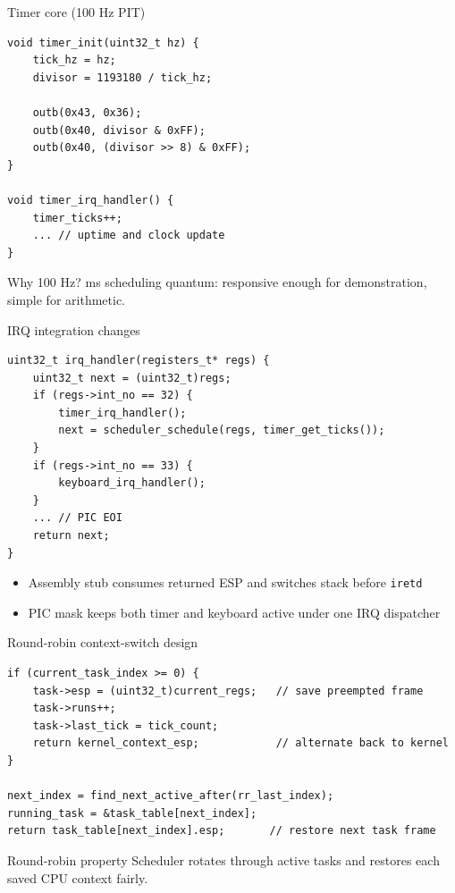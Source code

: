 \documentclass[aspectratio=169]{beamer}
\newcommand{\concept}[2]{%
  \begin{block}{#1}\smallskip #2\smallskip\end{block}\vspace{5pt}}
\begin{document}
\begin{frame}[fragile]{Timer core (100 Hz PIT)}
\begin{lstlisting}[style=clang]
void timer_init(uint32_t hz) {
    tick_hz = hz;
    divisor = 1193180 / tick_hz;

    outb(0x43, 0x36);
    outb(0x40, divisor & 0xFF);
    outb(0x40, (divisor >> 8) & 0xFF);
}

void timer_irq_handler() {
    timer_ticks++;
    ... // uptime and clock update
}
\end{lstlisting}
\concept{Why 100 Hz?}{
  10 ms scheduling quantum: responsive enough for demonstration, simple for arithmetic.
}
\end{frame}

\begin{frame}[fragile]{IRQ integration changes}
\begin{lstlisting}[style=clang]
uint32_t irq_handler(registers_t* regs) {
    uint32_t next = (uint32_t)regs;
    if (regs->int_no == 32) {
        timer_irq_handler();
        next = scheduler_schedule(regs, timer_get_ticks());
    }
    if (regs->int_no == 33) {
        keyboard_irq_handler();
    }
    ... // PIC EOI
    return next;
}
\end{lstlisting}
\begin{itemize}
  \item Assembly stub consumes returned ESP and switches stack before \texttt{iretd}
  \item PIC mask keeps both timer and keyboard active under one IRQ dispatcher
\end{itemize}
\end{frame}

\begin{frame}[fragile]{Round-robin context-switch design}
\begin{lstlisting}[style=clang]
if (current_task_index >= 0) {
    task->esp = (uint32_t)current_regs;   // save preempted frame
    task->runs++;
    task->last_tick = tick_count;
    return kernel_context_esp;            // alternate back to kernel
}

next_index = find_next_active_after(rr_last_index);
running_task = &task_table[next_index];
return task_table[next_index].esp;       // restore next task frame
\end{lstlisting}
\concept{Round-robin property}{
  Scheduler rotates through active tasks and restores each saved CPU context fairly.
}
\end{frame}
\end{document}
